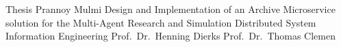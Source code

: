 


\frenchspacing
													{ Thesis }																			%
													{Prannoy Mulmi}														%
													{Design and Implementation of an Archive Microservice solution for the Multi-Agent Research and
													Simulation Distributed System}											  %
													{Information Engineering}						%
													{Prof.\ Dr.\ Henning Dierks}					%
													{Prof.\ Dr.\ Thomas Clemen}								%
													

